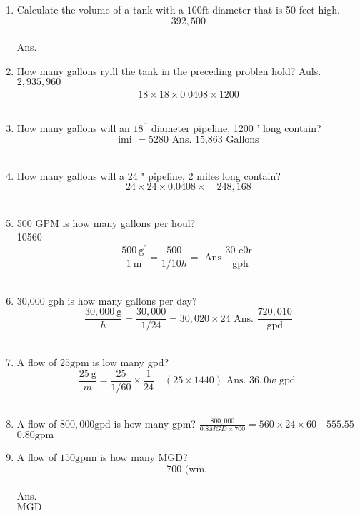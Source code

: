 \documentclass{article}
\begin{document}
\begin{enumerate}
\item Calculate the volume of a tank with a $100 \mathrm{ft}$ diameter that is 50 feet high.\\
$$392,500$$\\
Ans.\\

\item How many gallons ryill the tank in the preceding problen hold? Auls.\\
$2,935,960$\\
$$18 \times 18 \times 0^{\prime} 0408 \times 1200$$\\

\item How many gallons will an $18^{\prime \prime}$ diameter pipeline, 1200 ' long contain?\\
$$\text { imi }=5280 \text { Ans. 15,863 Gallons }$$\\

\item How many gallons will a 24 " pipeline, 2 miles long contain?\\
$$24 \times 24 \times 0.0408 \times \quad 248,168$$\\

\item 500 GPM is how many gallons per houl?\\
10560\\
$$\frac{500 \mathrm{~g}^{\prime}}{1 \mathrm{~m}}=\frac{500}{1 / 10 h}=\text { Ans } \frac{30 \text { e0r }}{\mathrm{gph}}$$\\

\item 30,000 gph is how many gallons per day?\\
$$\frac{30,000 \mathrm{~g}}{h}=\frac{30,000}{1 / 24}=30,020 \times 24 \text { Ans. } \frac{720,010}{\mathrm{gpd}}$$\\
\item A flow of $25 \mathrm{gpm}$ is low many gpd?\\
$$\frac{25 \mathrm{~g}}{m}=\frac{25}{1 / 60} \times \frac{1}{24} \quad(25 \times 1440) \text { Ans. } 36,0 w \text { gpd }$$\\

\item A flow of $800,000 \mathrm{gpd}$ is how many gpm? $\frac{800,000}{0.8 M G D \times 700}=560 \times 24 \times 60 \quad 555.55$\\
$0.80 \mathrm{gpm}$\\

\item A flow of $150 \mathrm{gpnn}$ is how many MGD?\\
$$700 \text { (wm. }$$\\
Ans.\\
$\mathrm{MGD}$\\


\end{enumerate}
\end{document}
